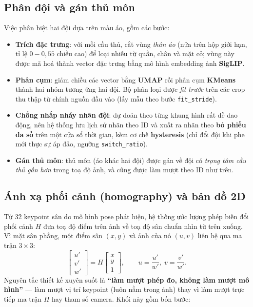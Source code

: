 \documentclass[12pt,a4paper]{article}
\begin{document}
\subsection{Phân đội và gán thủ môn}
Việc phân biệt hai đội dựa trên màu áo, gồm các bước:
\begin{itemize}[leftmargin=1.4em]
  \item \textbf{Trích đặc trưng}: với mỗi cầu thủ, cắt vùng \emph{thân áo} (nửa trên hộp
        giới hạn, tỉ lệ $0\!-\!0{,}55$ chiều cao) để loại nhiễu từ quần, chân và mặt cỏ;
        vùng này được mã hoá thành vector đặc trưng bằng mô hình embedding ảnh
        \textbf{SigLIP}.
  \item \textbf{Phân cụm}: giảm chiều các vector bằng \textbf{UMAP} rồi phân cụm
        \textbf{KMeans} thành hai nhóm tương ứng hai đội. Bộ phân loại được \emph{fit
        trước} trên các crop thu thập từ chính nguồn đầu vào (lấy mẫu theo bước
        \texttt{fit\_stride}).
  \item \textbf{Chống nhấp nháy nhãn đội}: dự đoán theo từng khung hình rất dễ dao động,
        nên hệ thống lưu lịch sử nhãn theo ID và xuất ra nhãn theo \textbf{bỏ phiếu đa số}
        trên một cửa sổ thời gian, kèm cơ chế \textbf{hysteresis} (chỉ đổi đội khi phe mới
        thực sự áp đảo, ngưỡng \texttt{switch\_ratio}).
  \item \textbf{Gán thủ môn}: thủ môn (áo khác hai đội) được gán về đội có \emph{trọng tâm
        cầu thủ gần hơn} trong toạ độ ảnh, và cũng được làm mượt theo ID như trên.
\end{itemize}

\subsection{Ánh xạ phối cảnh (homography) và bản đồ 2D}
\label{sec:homography}
Từ 32 keypoint sân do mô hình pose phát hiện, hệ thống ước lượng phép biến đổi phối cảnh
$H$ đưa toạ độ điểm trên ảnh về toạ độ sân chuẩn nhìn từ trên xuống. Vì mặt sân phẳng,
một điểm sân $(x,y)$ và ảnh của nó $(u,v)$ liên hệ qua ma trận $3\times3$:
\begin{equation}
  \begin{bmatrix} u' \\ v' \\ w' \end{bmatrix}
  = H \begin{bmatrix} x \\ y \\ 1 \end{bmatrix},\qquad
  u=\frac{u'}{w'},\; v=\frac{v'}{w'} .
\end{equation}
Nguyên tắc thiết kế xuyên suốt là \textbf{``làm mượt phép đo, không làm mượt mô hình''}
--- làm mượt vị trí keypoint (luôn nằm trong ảnh) thay vì làm mượt trực tiếp ma trận $H$
hay tham số camera. Khối này gồm bốn bước:
\end{document}
